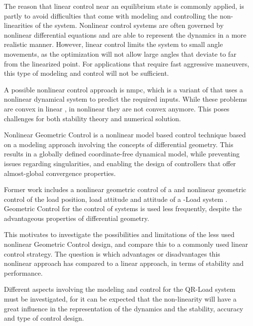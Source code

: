 The reason that linear control near an equilibrium state is commonly applied, is partly to avoid difficulties that come with modeling and controlling the non-linearities of the system. Nonlinear control systems are often governed by nonlinear differential equations and are able to represent the dynamics in a more realistic manner. However, linear control limits the system to small angle movements, as the optimization will not allow large angles that deviate to far from the linearized point. For applications that require fast aggressive maneuvers, this type of modeling and control will not be sufficient.

A possible nonlinear control approach is \acs{nmpc}, which is a variant of  that uses a nonlinear dynamical system to predict the required inputs. While these problems are convex in linear , in nonlinear  they are not convex anymore. This poses challenges for both  stability theory and numerical solution.

Nonlinear Geometric Control is a nonlinear model based control technique based on a modeling approach involving the concepts of differential geometry. This results in a globally defined coordinate-free dynamical model, while preventing issues regarding singularities, and enabling the design of controllers that offer almost-global convergence properties.

Former work includes a nonlinear geometric control of a  \cite{Lee2010,Goodarzi2013a} and nonlinear geometric control of the load position, load attitude and  attitude of a -Load system \cite{Sreenath2013a,Sreenath2013b,Tang2014}.
Geometric Control for the control of  systems is used less frequently, despite the advantageous properties of differential geometry. 

This motivates to investigate the possibilities and limitations of the less used nonlinear Geometric Control design, and compare this to a commonly used linear control strategy.
The question is which advantages or disadvantages this nonlinear approach has compared to a linear approach, in terms of stability and performance.



Different aspects involving the modeling and control for the QR-Load system must be investigated, for it can be expected that the non-linearity will have a great influence in the representation of the dynamics and the stability, accuracy and type of control design.


